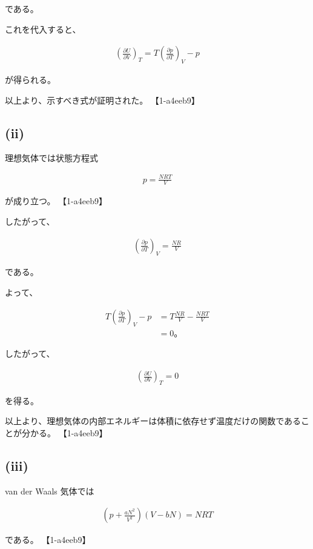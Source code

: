 \documentclass[platex,dvipdfmx,a4paper]{jsarticle}
\begin{document}
である。

これを代入すると、

\begin{align*}
\left(
\frac{\partial U}{\partial V}
\right)_T
=
T
\left(
\frac{\partial p}{\partial T}
\right)_V
-p
\end{align*}

が得られる。

以上より、示すべき式が証明された。 【1-a4eeb9】

\subsection{(ii)}

理想気体では状態方程式

\begin{align*}
p
=
\frac{NRT}{V}
\end{align*}

が成り立つ。 【1-a4eeb9】

したがって、

\begin{align*}
\left(
\frac{\partial p}{\partial T}
\right)_V
=
\frac{NR}{V}
\end{align*}

である。

よって、

\begin{align*}
T
\left(
\frac{\partial p}{\partial T}
\right)_V
-p
&=
T
\frac{NR}{V}
-
\frac{NRT}{V} \\
&=
0。
\end{align*}

したがって、

\begin{align*}
\left(
\frac{\partial U}{\partial V}
\right)_T
=
0
\end{align*}

を得る。

以上より、理想気体の内部エネルギーは体積に依存せず温度だけの関数であることが分かる。 【1-a4eeb9】

\subsection{(iii)}

van der Waals 気体では

\begin{align*}
\left(
p+\frac{aN^2}{V^2}
\right)
(V-bN)
=
NRT
\end{align*}

である。 【1-a4eeb9】
\end{document}
